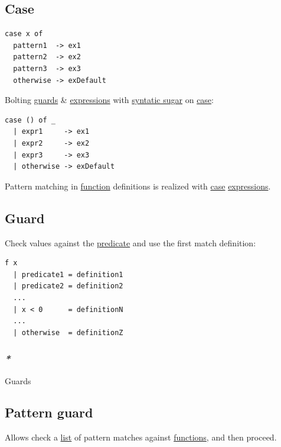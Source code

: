 \documentclass[a4paper,14pt,oneside]{book}
\begin{document}
{\subsection{\label{org6609611}Case}
\label{sec:org1b21db2}
\begin{verbatim}
case x of
  pattern1  -> ex1
  pattern2  -> ex2
  pattern3  -> ex3
  otherwise -> exDefault
\end{verbatim}

Bolting \hyperref[org1d2fe81]{guards} \& \hyperref[org6328353]{expressions} with \hyperref[org167875f]{syntatic sugar} on \hyperref[org6609611]{case}:\\
\begin{verbatim}
case () of _
  | expr1     -> ex1
  | expr2     -> ex2
  | expr3     -> ex3
  | otherwise -> exDefault
\end{verbatim}

Pattern matching in \hyperref[org6a60524]{function} definitions is realized with \hyperref[org6609611]{case} \hyperref[org6328353]{expressions}.\\

\subsection{\label{org2f42623}Guard}
\label{sec:org95d79c8}
Check values against the \hyperref[orga8f3cfc]{predicate} and use the first match definition:\\

\begin{verbatim}
f x
  | predicate1 = definition1
  | predicate2 = definition2
  ...
  | x < 0      = definitionN
  ...
  | otherwise  = definitionZ
\end{verbatim}

\subsubsection{\emph{*}}
\label{sec:org4acfef9}

\label{org1d2fe81}Guards\\

\subsection{\label{orgbc35f41}Pattern guard}
\label{sec:org8345d59}
Allows check a \hyperref[org47d56c8]{list} of pattern matches against \hyperref[orgf33f5fb]{functions}, and then proceed.\\

}
\end{document}
